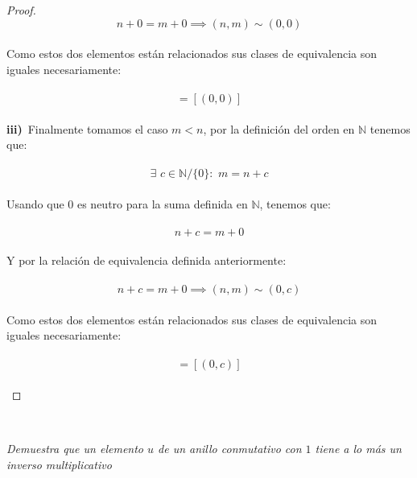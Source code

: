 \documentclass[11pt,letterpaper]{article}
\newcommand{\N}{\mathbb{N}}
\begin{document}
\begin{proof}
    \begin{equation*}
        n+0=m+0\implies (n,m)\sim(0,0)
    \end{equation*}\,\\
    Como estos dos elementos est\'an relacionados sus clases de equivalencia son iguales necesariamente:\,\\
    \,\\
    \begin{equation*}
        [(n,m)]=[(0,0)]
    \end{equation*}\,\\
    \textbf{iii)}\,\,\,Finalmente tomamos el caso $m<n$, por la definici\'on del orden en $\N$ tenemos que:\,\\
    \,\\
    \begin{equation*}
        \exists\,\,c\in \N/\{0\}:\,\,m=n+c
    \end{equation*}\,\\
    Usando que $0$ es neutro para la suma definida en $\N$, tenemos que:\,\\
    \,\\
    \begin{equation*}
    n+c=m+0
    \end{equation*}\,\\
    Y por la relaci\'on de equivalencia definida anteriormente:\,\\
    \,\\
    \begin{equation*}
        n+c=m+0\implies (n,m)\sim(0,c)
    \end{equation*}\,\\
    Como estos dos elementos est\'an relacionados sus clases de equivalencia son iguales necesariamente:\,\\
    \,\\
    \begin{equation*}
        [(n,m)]=[(0,c)]
    \end{equation*}\,\\
\end{proof}\,\\
\begin{tcolorbox}[
	title = \textcolor{black}{\textcolor{white}{Problema 3}},]
\textit{Demuestra que un elemento $u$ de un anillo conmutativo con $1$ tiene a lo m\'as un inverso multiplicativo
}
\end{tcolorbox}\,\\
\end{document}
